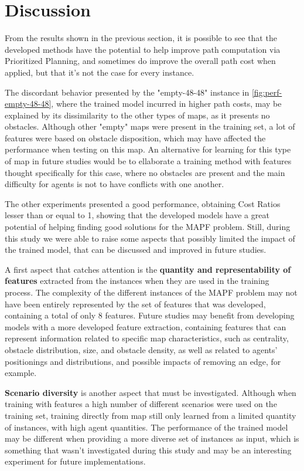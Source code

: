 \section{Discussion}

From the results shown in the previous section, it is possible to see that the developed methods have the potential to help improve path computation via Prioritized Planning, and sometimes do improve the overall path cost when applied, but that it's not the case for every instance.

The discordant behavior presented by the "empty-48-48" instance in \ref{fig:perf-empty-48-48}, where the trained model incurred in higher path costs, may be explained by its dissimilarity to the other types of maps, as it presents no obstacles. Although other "empty" maps were present in the training set, a lot of features were based on obstacle disposition, which may have affected the performance when testing on this map. An alternative for learning for this type of map in future studies would be to ellaborate a training method with features thought specifically for this case, where no obstacles are present and the main difficulty for agents is not to have conflicts with one another.

The other experiments presented a good performance, obtaining Cost Ratios lesser than or equal to 1, showing that the developed models have a great potential of helping finding good solutions for the MAPF problem. Still, during this study we were able to raise some aspects that possibly limited the impact of the trained model, that can be discussed and improved in future studies.

A first aspect that catches attention is the \textbf{quantity and representability of features} extracted from the instances when they are used in the training process. The complexity of the different instances of the MAPF problem may not have been entirely represented by the set of features that was developed, containing a total of only 8 features. Future studies may benefit from developing models with a more developed feature extraction, containing features that can represent information related to specific map characteristics, such as centrality, obstacle distribution, size, and obstacle density, as well as related to agents' positionings and distributions, and possible impacts of removing an edge, for example.

\textbf{Scenario diversity} is another aspect that must be investigated. Although when training with features a high number of different scenarios were used on the training set, training directly from map still only learned from a limited quantity of instances, with high agent quantities. The performance of the trained model may be different when providing a more diverse set of instances as input, which is something that wasn't investigated during this study and may be an interesting experiment for future implementations.

